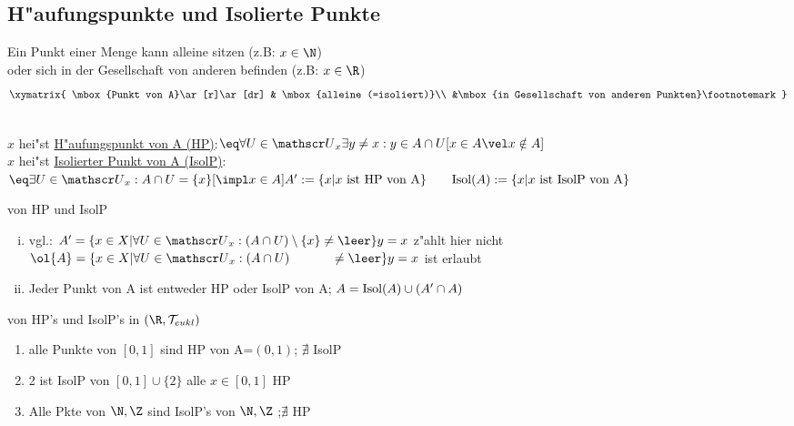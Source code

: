 \subsection{H"aufungspunkte und Isolierte Punkte}
Ein Punkt einer Menge kann alleine sitzen (z.B: $x\in\N$)\\
oder sich in der Gesellschaft von anderen befinden (z.B: $x\in\R$)
$$\xymatrix{
\mbox{Punkt von A}\ar[r]\ar[dr] & \mbox{alleine (=isoliert)}\\
&\mbox{in Gesellschaft von anderen Punkten}\footnotemark
}$$

\begin{definition}\label{2.41}\\
$x$ hei"st \ul{H"aufungspunkt von A (HP)}:$\eq \forall U\in \umg{U}{x}\exists y\neq x:y\in A\cap U [x\in A\vel x\notin A]$\\
$x$ hei"st \ul{Isolierter Punkt von A (IsolP)}:$\eq \exists U\in\umg{U}{x}:A\cap U =\{ x\} [\impl x\in A]\\
A':=\{ x|x\mbox{ ist HP von A}\}\qquad \isol{A}:=\{ x|x\mbox{ ist IsolP von A}\}$
\end{definition}

\begin{beob}\label{2.42}{von HP und IsolP}
\begin{enumerate}[(i)]
\item vgl.: $A' =\{ x\in X|\forall U\in\umg{U}{x}: (A\cap U)\setminus\{ x\}\neq\leer\} y = x$ z"ahlt hier nicht\\
\hspace*{0.9cm}$\ol{A}=\{ x\in X|\forall U\in\umg{U}{x}: (A\cap U)\hspace*{1.15cm}\neq\leer\} y = x$ ist erlaubt
\item Jeder Punkt von A ist entweder HP oder IsolP von A; $A = \mbox{Isol}(A ) \cup (A' \cap A)$
\end{enumerate}

\end{beob}

\begin{beispiel}\label{2.43}{von HP's und IsolP's in $(\R,\T_{eukl})$ }
\begin{enumerate}
\item alle Punkte von $[0,1]$ sind HP von A=$(0,1)$; $\nexists$ IsolP
\item 2 ist IsolP von $[0,1]\cup \{ 2\}$ alle $x\in [0,1]$ HP
\item Alle Pkte von $\N ,\Z$ sind IsolP's von $\N ,\Z$ ;$\nexists$ HP
\end{enumerate}
\end{beispiel}


